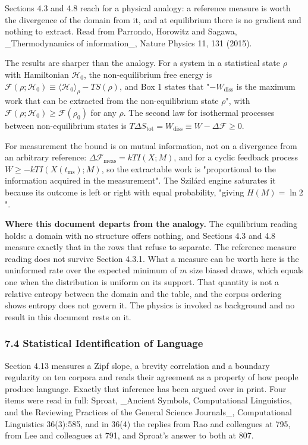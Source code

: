 Sections 4.3 and 4.8 reach for a physical analogy: a reference measure is worth the divergence of the domain from it, and at equilibrium there is no gradient and nothing to extract. Read from Parrondo, Horowitz and Sagawa, \_Thermodynamics of information\_, Nature Physics 11, 131 (2015).

The results are sharper than the analogy. For a system in a statistical state \(\rho\) with Hamiltonian \(\mathcal{H}_0\), the non-equilibrium free energy is \(\mathcal{F}(\rho;\mathcal{H}_0) \equiv \langle \mathcal{H}_0\rangle_\rho - TS(\rho)\), and Box 1 states that "\(-W_{\text{diss}}\) is the maximum work that can be extracted from the non-equilibrium state \(\rho\)", with \(\mathcal{F}(\rho;\mathcal{H}_0) \ge \mathcal{F}(\rho_0)\) for any \(\rho\). The second law for isothermal processes between non-equilibrium states is \(T\Delta S_{\text{tot}} = W_{\text{diss}} \equiv W - \Delta\mathcal{F} \ge 0\).

For measurement the bound is on mutual information, not on a divergence from an arbitrary reference: \(\Delta \mathcal{F}_{\text{meas}} = kTI(X;M)\), and for a cyclic feedback process \(W \ge -kTI(X(t_{\text{ms}});M)\), so the extractable work is "proportional to the information acquired in the measurement". The Szilárd engine saturates it because its outcome is left or right with equal probability, "giving \(H(M) = \ln 2\)".

\textbf{Where this document departs from the analogy.} The equilibrium reading holds: a domain with no structure offers nothing, and Sections 4.3 and 4.8 measure exactly that in the rows that refuse to separate. The reference measure reading does not survive Section 4.3.1. What a measure can be worth here is the uninformed rate over the expected minimum of \(m\) size biased draws, which equals one when the distribution is uniform on its support. That quantity is not a relative entropy between the domain and the table, and the corpus ordering shows entropy does not govern it. The physics is invoked as background and no result in this document rests on it.

\subsubsection{7.4 Statistical Identification of Language}

Section 4.13 measures a Zipf slope, a brevity correlation and a boundary regularity on ten corpora and reads their agreement as a property of how people produce language. Exactly that inference has been argued over in print. Four items were read in full: Sproat, \_Ancient Symbols, Computational Linguistics, and the Reviewing Practices of the General Science Journals\_, Computational Linguistics 36(3):585, and in 36(4) the replies from Rao and colleagues at 795, from Lee and colleagues at 791, and Sproat's answer to both at 807.


